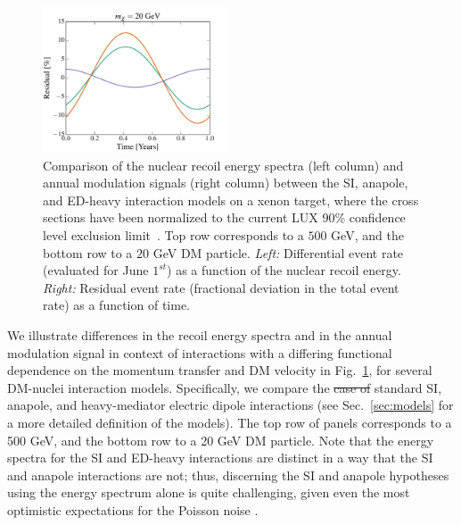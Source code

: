 \documentclass[11pt]{article}
\newcommand{\Sec}[1]{Sec.~\ref{#1}} \newcommand{\Secs}[2]{Secs.~\ref{#1} and \ref{#2}} \newcommand{\Secm}[2]{Secs.~\ref{#1} through \ref{#2}}
\newcommand{\Fig}[1]{Fig.~\ref{#1}} \newcommand{\Figs}[2]{Figs.~\ref{#1} and \ref{#2}}
\newcommand{\sjwColor}{red}
\newcommand{\sjwrm}[1]{{\color{\sjwColor}\protect\sout{#1}}}
\begin{document}
\begin{figure}
\includegraphics[width=0.49\textwidth, trim=0.cm 0.0cm 0.cm 0.0cm,clip=true]{plots/Xenon_SIvsAnapole_20GeV_Residual_Theory.pdf}
\caption{\label{fig:diff_rate_comp}
Comparison of the nuclear recoil energy spectra (left column) and annual modulation signals (right column) between the SI, anapole, and ED-heavy interaction models on a xenon target, where the cross sections have been normalized to the current LUX 90\% confidence level exclusion limit~\cite{Akerib:2016vxi}. Top row corresponds to a $500$ GeV, and the bottom row to a $20$ GeV DM particle. \emph{Left:} Differential event rate (evaluated for June $1^{st}$) as a function of the nuclear recoil energy. \emph{Right:} Residual event rate (fractional deviation in the total event rate) as a function of time.}
\end{figure}

We illustrate differences in the recoil energy spectra and in the annual modulation signal in context of interactions with a differing functional dependence on the momentum transfer and DM velocity in \Fig{fig:diff_rate_comp}, for several DM-nuclei interaction models. Specifically, we compare the \sjwrm{case of} standard SI, anapole, and heavy-mediator electric dipole interactions (see \Sec{sec:models} for a more detailed definition of the models). The top row of panels corresponds to a 500 GeV, and the bottom row to a 20 GeV DM particle.  Note that the energy spectra for the SI and ED-heavy interactions are distinct in a way that the SI and anapole interactions are not; thus, discerning the SI and anapole hypotheses using the energy spectrum alone is quite challenging, given even the most optimistic expectations for the Poisson noise \cite{Gluscevic:2015sqa}. 
\end{document}
